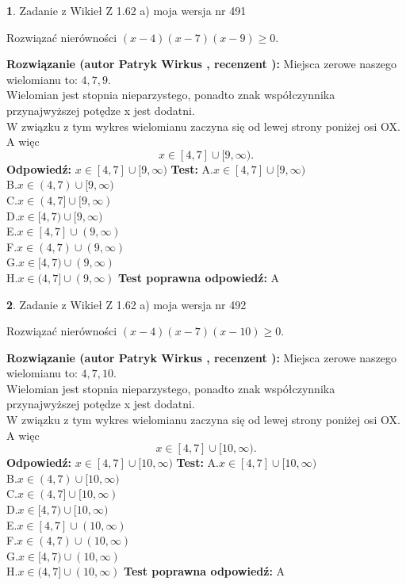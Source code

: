 \documentclass[12pt, a4paper]{article}
\theoremstyle{definition} %
\newtheorem{zad}{}
\newcommand{\zadStart}[1]{\begin{zad}#1\newline}
\newcommand{\zadStop}{\end{zad}}
\newcommand{\rozwStart}[2]{\noindent \textbf{Rozwiązanie (autor #1 , recenzent #2): }\newline}
\newcommand{\rozwStop}{\newline}
\newcommand{\odpStart}{\noindent \textbf{Odpowiedź:}\newline}
\newcommand{\odpStop}{\newline}
\newcommand{\testStart}{\noindent \textbf{Test:}\newline}
\newcommand{\testStop}{\newline}
\newcommand{\kluczStart}{\noindent \textbf{Test poprawna odpowiedź:}\newline}
\newcommand{\kluczStop}{\newline}
\begin{document}
\zadStart{Zadanie z Wikieł Z 1.62 a) moja wersja nr 491}

Rozwiązać nierówności $(x-4)(x-7)(x-9)\ge0$.
\zadStop
\rozwStart{Patryk Wirkus}{}
Miejsca zerowe naszego wielomianu to: $4, 7, 9$.\\
Wielomian jest stopnia nieparzystego, ponadto znak współczynnika przy\linebreak najwyższej potędze x jest dodatni.\\ W związku z tym wykres wielomianu zaczyna się od lewej strony poniżej osi OX. A więc $$x \in [4,7] \cup [9,\infty).$$
\rozwStop
\odpStart
$x \in [4,7] \cup [9,\infty)$
\odpStop
\testStart
A.$x \in [4,7] \cup [9,\infty)$\\
B.$x \in (4,7) \cup [9,\infty)$\\
C.$x \in (4,7] \cup [9,\infty)$\\
D.$x \in [4,7) \cup [9,\infty)$\\
E.$x \in [4,7] \cup (9,\infty)$\\
F.$x \in (4,7) \cup (9,\infty)$\\
G.$x \in [4,7) \cup (9,\infty)$\\
H.$x \in (4,7] \cup (9,\infty)$
\testStop
\kluczStart
A
\kluczStop



\zadStart{Zadanie z Wikieł Z 1.62 a) moja wersja nr 492}

Rozwiązać nierówności $(x-4)(x-7)(x-10)\ge0$.
\zadStop
\rozwStart{Patryk Wirkus}{}
Miejsca zerowe naszego wielomianu to: $4, 7, 10$.\\
Wielomian jest stopnia nieparzystego, ponadto znak współczynnika przy\linebreak najwyższej potędze x jest dodatni.\\ W związku z tym wykres wielomianu zaczyna się od lewej strony poniżej osi OX. A więc $$x \in [4,7] \cup [10,\infty).$$
\rozwStop
\odpStart
$x \in [4,7] \cup [10,\infty)$
\odpStop
\testStart
A.$x \in [4,7] \cup [10,\infty)$\\
B.$x \in (4,7) \cup [10,\infty)$\\
C.$x \in (4,7] \cup [10,\infty)$\\
D.$x \in [4,7) \cup [10,\infty)$\\
E.$x \in [4,7] \cup (10,\infty)$\\
F.$x \in (4,7) \cup (10,\infty)$\\
G.$x \in [4,7) \cup (10,\infty)$\\
H.$x \in (4,7] \cup (10,\infty)$
\testStop
\kluczStart
A
\kluczStop
\end{document}
